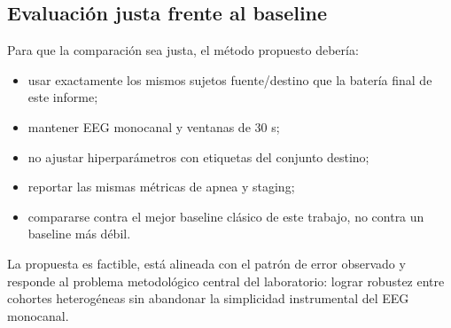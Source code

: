 \subsection{Evaluaci\'on justa frente al baseline}

Para que la comparaci\'on sea justa, el m\'etodo propuesto deber\'ia:
\begin{itemize}[leftmargin=*]
\item usar exactamente los mismos sujetos fuente/destino que la bater\'ia final de este informe;
\item mantener EEG monocanal y ventanas de 30 s;
\item no ajustar hiperpar\'ametros con etiquetas del conjunto destino;
\item reportar las mismas m\'etricas de apnea y staging;
\item compararse contra el mejor baseline cl\'asico de este trabajo, no contra un baseline m\'as d\'ebil.
\end{itemize}

La propuesta es factible, est\'a alineada con el patr\'on de error observado y responde al problema metodol\'ogico central del laboratorio: lograr robustez entre cohortes heterog\'eneas sin abandonar la simplicidad instrumental del EEG monocanal.
